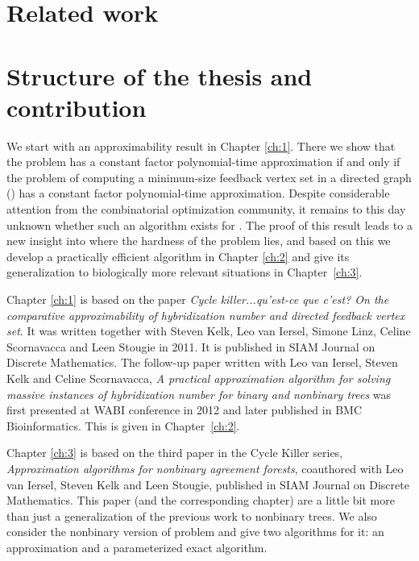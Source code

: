 {\section{Related work}
  

  
  
\section{Structure of the thesis and contribution}

We start with an approximability result in Chapter \ref{ch:1}. There we show that the problem \mh has a constant factor polynomial-time approximation if and only if the problem of computing a minimum-size feedback vertex set in a directed graph (\dfvs) has a constant factor polynomial-time approximation. Despite considerable attention from the combinatorial optimization community, it remains to this day unknown whether such an algorithm exists for \dfvs. The proof of this result leads to a new insight into where the hardness of the problem lies, and based on this we develop a practically efficient algorithm in Chapter \ref{ch:2} and give its generalization to biologically more relevant situations in Chapter~\ref{ch:3}. 

Chapter \ref{ch:1} is based on the paper \textit{Cycle killer...qu'est-ce que c'est? On the comparative approximability of hybridization number and directed feedback vertex set}. It was written together with Steven Kelk, Leo van Iersel, Simone Linz, Celine Scornavacca and Leen Stougie in 2011. It is published in SIAM Journal on Discrete Mathematics. The follow-up paper written with Leo van Iersel, Steven Kelk and Celine Scornavacca, \textit{A practical approximation algorithm for solving massive instances of hybridization number for binary and nonbinary trees} was first presented at WABI conference in 2012 and later published in BMC Bioinformatics. This is given in Chapter~\ref{ch:2}.

Chapter \ref{ch:3} is based on the third paper in the Cycle Killer series, \textit{Approximation algorithms for nonbinary agreement forests}, coauthored with Leo van Iersel, Steven Kelk and Leen Stougie, published in SIAM Journal on Discrete Mathematics. This paper (and the corresponding chapter) are a little bit more than just a generalization of the previous work to nonbinary trees. We also consider the nonbinary version of problem \maf and give two algorithms for it: an approximation and a parameterized exact algorithm.

}
